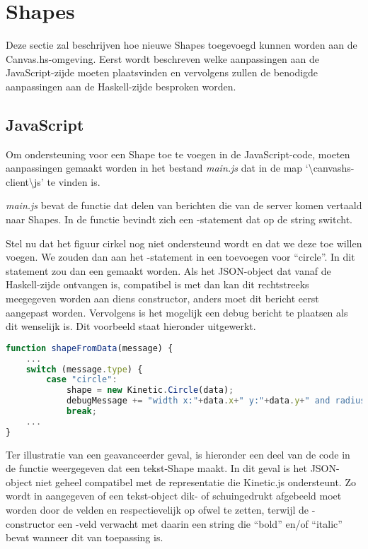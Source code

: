 \section{Shapes}
Deze sectie zal beschrijven hoe nieuwe Shapes toegevoegd kunnen worden aan de Canvas.hs-omgeving. Eerst wordt beschreven welke aanpassingen aan de JavaScript-zijde moeten plaatsvinden en vervolgens zullen de benodigde aanpassingen aan de Haskell-zijde besproken worden.

\subsection{JavaScript}
Om ondersteuning voor een Shape toe te voegen in de JavaScript-code, moeten aanpassingen gemaakt worden in het bestand \emph{main.js} dat in de map `\textbackslash canvashs-client\textbackslash js' te vinden is.

\emph{main.js} bevat de functie  dat delen van berichten die van de server komen vertaald naar Shapes. In de  functie bevindt zich een -statement dat op de string  switcht.

Stel nu dat het figuur cirkel nog niet ondersteund wordt en dat we deze toe willen voegen. We zouden dan aan het -statement in  een  toevoegen voor ``circle''. In dit  statement zou dan een  gemaakt worden. Als het JSON-object  dat vanaf de Haskell-zijde ontvangen is, compatibel is met  dan kan dit rechtstreeks meegegeven worden aan diens constructor, anders moet dit bericht eerst aangepast worden. Vervolgens is het mogelijk een debug bericht te plaatsen als dit wenselijk is. Dit voorbeeld staat hieronder uitgewerkt.

\begin{lstlisting}[language=JavaScript]
function shapeFromData(message) {
	...
	switch (message.type) {
		case "circle":
			shape = new Kinetic.Circle(data);
			debugMessage += "width x:"+data.x+" y:"+data.y+" and radius:"+data.radius;
			break;
	...
}
\end{lstlisting}

Ter illustratie van een geavanceerder geval, is hieronder een deel van de code in de  functie weergegeven dat een tekst-Shape maakt. In dit geval is het  JSON-object niet geheel compatibel met de representatie die Kinetic.js ondersteunt. Zo wordt in  aangegeven of een tekst-object dik- of schuingedrukt afgebeeld moet worden door de velden  en respectievelijk  op  ofwel  te zetten, terwijl de -constructor een -veld verwacht met daarin een string die ``bold'' en/of ``italic'' bevat wanneer dit van toepassing is.


